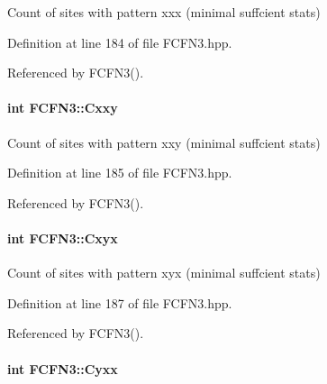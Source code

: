 \-Count of sites with pattern xxx (minimal suffcient stats) 



\-Definition at line 184 of file \-F\-C\-F\-N3.\-hpp.



\-Referenced by \-F\-C\-F\-N3().

\hypertarget{classFCFN3_a1a5c9deec90452588e2f57f5291881b0}{
\paragraph[{\-Cxxy}]{\setlength{\rightskip}{0pt plus 5cm}int {\bf \-F\-C\-F\-N3\-::\-Cxxy}}}\label{classFCFN3_a1a5c9deec90452588e2f57f5291881b0}


\-Count of sites with pattern xxy (minimal suffcient stats) 



\-Definition at line 185 of file \-F\-C\-F\-N3.\-hpp.



\-Referenced by \-F\-C\-F\-N3().

\hypertarget{classFCFN3_a60144493a83a2555c774cf7dfa4c9ec0}{
\paragraph[{\-Cxyx}]{\setlength{\rightskip}{0pt plus 5cm}int {\bf \-F\-C\-F\-N3\-::\-Cxyx}}}\label{classFCFN3_a60144493a83a2555c774cf7dfa4c9ec0}
\-Count of sites with pattern xyx (minimal suffcient stats) 

\-Definition at line 187 of file \-F\-C\-F\-N3.\-hpp.



\-Referenced by \-F\-C\-F\-N3().

\hypertarget{classFCFN3_a4e3aae643d4c68030d916df7ac71b538}{
\paragraph[{\-Cyxx}]{\setlength{\rightskip}{0pt plus 5cm}int {\bf \-F\-C\-F\-N3\-::\-Cyxx}}}\label{classFCFN3_a4e3aae643d4c68030d916df7ac71b538}


